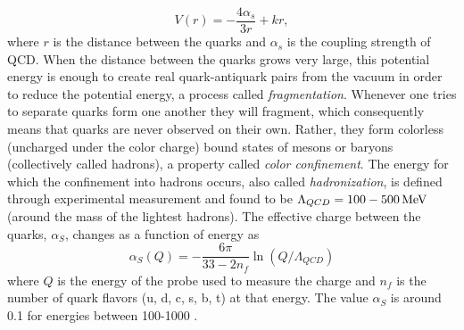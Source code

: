 \begin{equation}
  V(r)=-\frac{4\alpha_s}{3r}+kr,
\end{equation} 
where $r$ is the distance between the quarks and $\alpha_s$ is the coupling strength of QCD.
When the distance between the quarks grows very large, this potential energy is enough to create real quark-antiquark pairs from the vacuum in order to reduce the potential energy, a process called \emph{fragmentation}. Whenever one tries to separate quarks form one another they will fragment, which consequently means that quarks are never observed on their own. Rather, they form colorless (uncharged under the color charge) bound states of mesons or baryons (collectively called hadrons), a property called \emph{color confinement}. The energy for which the confinement into hadrons occurs, also called \emph{hadronization}, is defined through experimental measurement and found to be $\Lambda_{QCD}=100-500 \,\text{Me\hspace{-.08em}V}$ (around the mass of the lightest hadrons). The effective charge between the quarks, $\alpha_S$, changes as a function of energy as
 \begin{equation}
   \alpha_S(Q)=-\frac{6\pi}{33-2n_f}\ln(Q/\Lambda_{QCD})
 \end{equation}
where $Q$ is the energy of the probe used to measure the charge and $n_f$ is the number of quark flavors (u, d, c, s, b, t) at that energy. The value $\alpha_S$ is around 0.1 for energies between 100-1000 \GeV.

